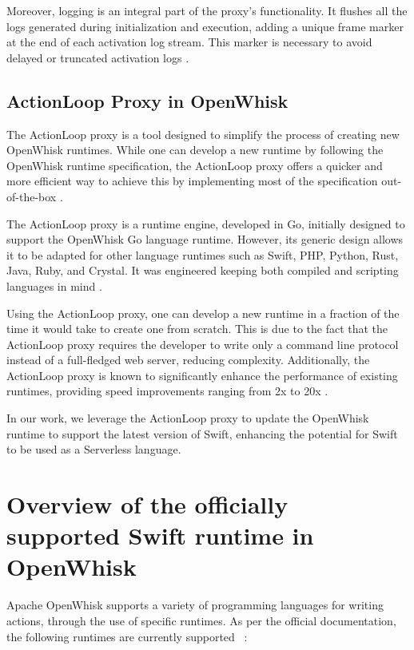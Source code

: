 Moreover, logging is an integral part of the proxy's functionality. It flushes all the logs generated during initialization and execution, adding a unique frame marker at the end of each activation log stream. This marker is necessary to avoid delayed or truncated activation logs \cite{openwhisk2021}.

\subsection{ActionLoop Proxy in OpenWhisk}

The ActionLoop proxy is a tool designed to simplify the process of creating new OpenWhisk runtimes. While one can develop a new runtime by following the OpenWhisk runtime specification, the ActionLoop proxy offers a quicker and more efficient way to achieve this by implementing most of the specification out-of-the-box \cite{openwhisk2023}.

The ActionLoop proxy is a runtime engine, developed in Go, initially designed to support the OpenWhisk Go language runtime. However, its generic design allows it to be adapted for other language runtimes such as Swift, PHP, Python, Rust, Java, Ruby, and Crystal. It was engineered keeping both compiled and scripting languages in mind \cite{openwhisk2023}.

Using the ActionLoop proxy, one can develop a new runtime in a fraction of the time it would take to create one from scratch. This is due to the fact that the ActionLoop proxy requires the developer to write only a command line protocol instead of a full-fledged web server, reducing complexity. Additionally, the ActionLoop proxy is known to significantly enhance the performance of existing runtimes, providing speed improvements ranging from 2x to 20x \cite{openwhisk2023}.

In our work, we leverage the ActionLoop proxy to update the OpenWhisk runtime to support the latest version of Swift, enhancing the potential for Swift to be used as a Serverless language.

\section{Overview of the officially supported Swift runtime in OpenWhisk}
Apache OpenWhisk supports a variety of programming languages for writing actions, through the use of specific runtimes. As per the official documentation, the following runtimes are currently supported 
~\cite{openwhisk2023}:


